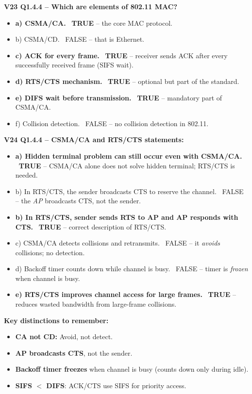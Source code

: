 \begin{exambox}
\textbf{V23 Q1.4.4 -- Which are elements of 802.11 MAC?}
\begin{itemize}[noitemsep]
    \item \textbf{a) CSMA/CA.} \checkmark\ \textbf{TRUE} -- the core MAC protocol.
    \item b) CSMA/CD. \texttimes\ FALSE -- that is Ethernet.
    \item \textbf{c) ACK for every frame.} \checkmark\ \textbf{TRUE} -- receiver sends ACK after every successfully received frame (SIFS wait).
    \item \textbf{d) RTS/CTS mechanism.} \checkmark\ \textbf{TRUE} -- optional but part of the standard.
    \item \textbf{e) DIFS wait before transmission.} \checkmark\ \textbf{TRUE} -- mandatory part of CSMA/CA.
    \item f) Collision detection. \texttimes\ FALSE -- no collision detection in 802.11.
\end{itemize}

\medskip
\textbf{V24 Q1.4.4 -- CSMA/CA and RTS/CTS statements:}
\begin{itemize}[noitemsep]
    \item \textbf{a) Hidden terminal problem can still occur even with CSMA/CA.} \checkmark\ \textbf{TRUE} -- CSMA/CA alone does not solve hidden terminal; RTS/CTS is needed.
    \item b) In RTS/CTS, the sender broadcasts CTS to reserve the channel. \texttimes\ FALSE -- the \emph{AP} broadcasts CTS, not the sender.
    \item \textbf{b) In RTS/CTS, sender sends RTS to AP and AP responds with CTS.} \checkmark\ \textbf{TRUE} -- correct description of RTS/CTS.
    \item c) CSMA/CA detects collisions and retransmits. \texttimes\ FALSE -- it \emph{avoids} collisions; no detection.
    \item d) Backoff timer counts down while channel is busy. \texttimes\ FALSE -- timer is \emph{frozen} when channel is busy.
    \item \textbf{e) RTS/CTS improves channel access for large frames.} \checkmark\ \textbf{TRUE} -- reduces wasted bandwidth from large-frame collisions.
\end{itemize}

\medskip
\textbf{Key distinctions to remember:}
\begin{itemize}[noitemsep]
    \item \textbf{CA not CD:} Avoid, not detect.
    \item \textbf{AP broadcasts CTS}, not the sender.
    \item \textbf{Backoff timer freezes} when channel is busy (counts down only during idle).
    \item \textbf{SIFS $<$ DIFS}: ACK/CTS use SIFS for priority access.
\end{itemize}
\end{exambox}

